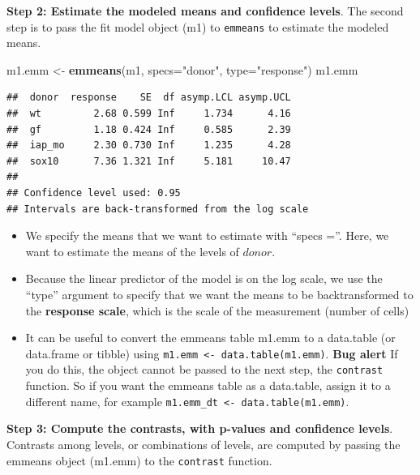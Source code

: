 \documentclass[]{book}
\newenvironment{Shaded}{\begin{snugshade}}{\end{snugshade}}
\newcommand{\DataTypeTok}[1]{\textcolor[rgb]{0.13,0.29,0.53}{#1}}
\newcommand{\KeywordTok}[1]{\textcolor[rgb]{0.13,0.29,0.53}{\textbf{#1}}}
\newcommand{\NormalTok}[1]{#1}
\newcommand{\OperatorTok}[1]{\textcolor[rgb]{0.81,0.36,0.00}{\textbf{#1}}}
\newcommand{\OtherTok}[1]{\textcolor[rgb]{0.56,0.35,0.01}{#1}}
\newcommand{\StringTok}[1]{\textcolor[rgb]{0.31,0.60,0.02}{#1}}
\providecommand{\tightlist}{%
  \setlength{\itemsep}{0pt}\setlength{\parskip}{0pt}}
\begin{document}
\textbf{Step 2: Estimate the modeled means and confidence levels}. The second step is to pass the fit model object (m1) to \texttt{emmeans} to estimate the modeled means.

\begin{Shaded}
\begin{Highlighting}[]
\NormalTok{m1.emm <-}\StringTok{ }\KeywordTok{emmeans}\NormalTok{(m1, }\DataTypeTok{specs=}\StringTok{"donor"}\NormalTok{, }\DataTypeTok{type=}\StringTok{"response"}\NormalTok{)}
\NormalTok{m1.emm}
\end{Highlighting}
\end{Shaded}

\begin{verbatim}
##  donor  response    SE  df asymp.LCL asymp.UCL
##  wt         2.68 0.599 Inf     1.734      4.16
##  gf         1.18 0.424 Inf     0.585      2.39
##  iap_mo     2.30 0.730 Inf     1.235      4.28
##  sox10      7.36 1.321 Inf     5.181     10.47
## 
## Confidence level used: 0.95 
## Intervals are back-transformed from the log scale
\end{verbatim}

\begin{itemize}
\tightlist
\item
  We specify the means that we want to estimate with ``specs =''. Here, we want to estimate the means of the levels of \(donor\).
\item
  Because the linear predictor of the model is on the log scale, we use the ``type'' argument to specify that we want the means to be backtransformed to the \textbf{response scale}, which is the scale of the measurement (number of cells)
\item
  It can be useful to convert the emmeans table m1.emm to a data.table (or data.frame or tibble) using \texttt{m1.emm\ \textless{}-\ data.table(m1.emm)}. \textbf{Bug alert} If you do this, the object cannot be passed to the next step, the \texttt{contrast} function. So if you want the emmeans table as a data.table, assign it to a different name, for example \texttt{m1.emm\_dt\ \textless{}-\ data.table(m1.emm)}.
\end{itemize}

\textbf{Step 3: Compute the contrasts, with p-values and confidence levels}. Contrasts among levels, or combinations of levels, are computed by passing the emmeans object (m1.emm) to the \texttt{contrast} function.

\begin{Shaded}
\end{Shaded}
\end{document}
